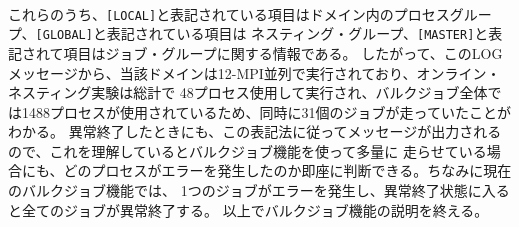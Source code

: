 \\

これらのうち、\verb|[LOCAL]|と表記されている項目はドメイン内のプロセスグループ、\verb|[GLOBAL]|と表記されている項目は
ネスティング・グループ、\verb|[MASTER]|と表記されて項目はジョブ・グループに関する情報である。
したがって、このLOGメッセージから、当該ドメインは12-MPI並列で実行されており、オンライン・ネスティング実験は総計で
48プロセス使用して実行され、バルクジョブ全体では1488プロセスが使用されているため、同時に31個のジョブが走っていたことがわかる。
異常終了したときにも、この表記法に従ってメッセージが出力されるので、これを理解しているとバルクジョブ機能を使って多量に
走らせている場合にも、どのプロセスがエラーを発生したのか即座に判断できる。ちなみに現在のバルクジョブ機能では、
1つのジョブがエラーを発生し、異常終了状態に入ると全てのジョブが異常終了する。
以上でバルクジョブ機能の説明を終える。



